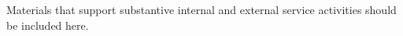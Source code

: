Materials that support substantive internal and external service activities should be included here.
